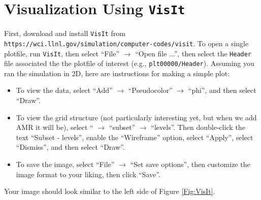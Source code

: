 \section{Visualization Using {\tt VisIt}}\label{Sec:VisIt}
First, download and install {\tt VisIt} from {\tt https://wci.llnl.gov/simulation/computer-codes/visit}.
To open a single plotfile, run {\tt VisIt}, then select ``File'' $\rightarrow$ ``Open file ...'',
then select the {\tt Header} file associated the the plotfile of interest (e.g., {\tt plt00000/Header}).
Assuming you ran the simulation in 2D, here are instructions for making a simple plot:
\begin{itemize}
\item To view the data, select ``Add'' $\rightarrow$ ``Pseudocolor'' $\rightarrow$ ``phi'', and then select
``Draw''.
\item To view the grid structure (not particularly interesting yet, but when we add AMR it will be), select
`` $\rightarrow$ ``subset'' $\rightarrow$ ``levels''.  Then double-click the text ``Subset - levels'',
enable the ``Wireframe'' option, select ``Apply'', select ``Dismiss'', and then select ``Draw''.
\item To save the image, select ``File'' $\rightarrow$ ``Set save options'', then customize the image format
to your liking, then click ``Save''.
\end{itemize}
Your image should look similar to the left side of Figure \ref{Fig:VisIt}.\\

